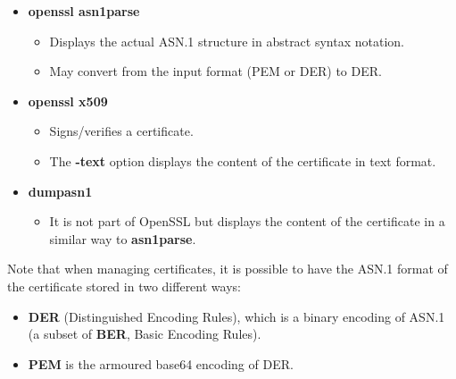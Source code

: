 \begin{itemize}
    \item \textbf{openssl asn1parse}
        \begin{itemize}
            \item Displays the actual ASN.1 structure in abstract 
                  syntax notation.
            \item May convert from the input format (PEM or DER) 
                  to DER.
        \end{itemize}
    \item \textbf{openssl x509}
        \begin{itemize}
            \item Signs/verifies a certificate.
            \item The \textbf{-text} option displays the content 
                  of the certificate in text format.
        \end{itemize}
    \item \textbf{dumpasn1}
        \begin{itemize}
            \item It is not part of OpenSSL but displays the content 
                  of the certificate in a similar way to \textbf{asn1parse}.
        \end{itemize}
\end{itemize}

Note that when managing certificates, it is possible to have the 
ASN.1 format of the certificate stored in two different ways:

\begin{itemize}
    \item \textbf{DER} (Distinguished Encoding Rules), which is a 
          binary encoding of ASN.1 (a subset of \textbf{BER}, Basic 
          Encoding Rules).
    \item \textbf{PEM} is the armoured base64 encoding of DER.
\end{itemize}

